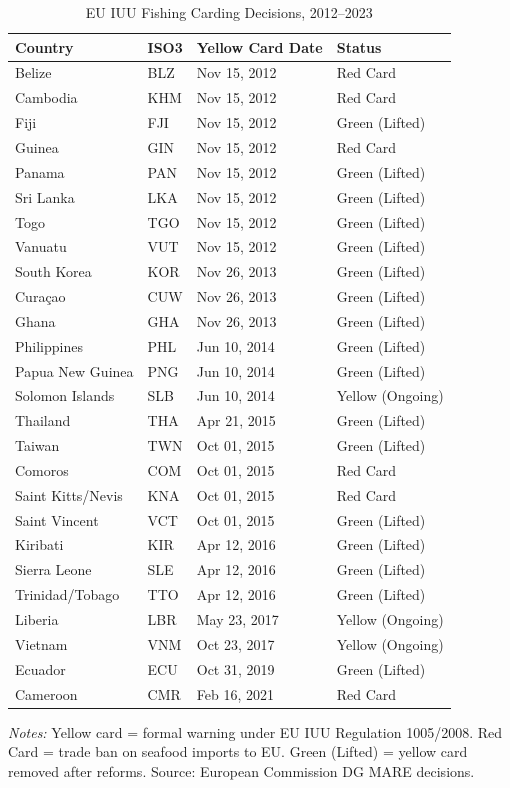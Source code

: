 \begin{table}[t]
\centering
\caption{EU IUU Fishing Carding Decisions, 2012--2023}
\label{tab:cohorts}
\begin{threeparttable}
\begin{tabular}{llll}
\toprule
Country & ISO3 & Yellow Card Date & Status \\
\midrule
Belize & BLZ & Nov 15, 2012 & Red Card \\
Cambodia & KHM & Nov 15, 2012 & Red Card \\
Fiji & FJI & Nov 15, 2012 & Green (Lifted) \\
Guinea & GIN & Nov 15, 2012 & Red Card \\
Panama & PAN & Nov 15, 2012 & Green (Lifted) \\
Sri Lanka & LKA & Nov 15, 2012 & Green (Lifted) \\
Togo & TGO & Nov 15, 2012 & Green (Lifted) \\
Vanuatu & VUT & Nov 15, 2012 & Green (Lifted) \\
South Korea & KOR & Nov 26, 2013 & Green (Lifted) \\
Curaçao & CUW & Nov 26, 2013 & Green (Lifted) \\
Ghana & GHA & Nov 26, 2013 & Green (Lifted) \\
Philippines & PHL & Jun 10, 2014 & Green (Lifted) \\
Papua New Guinea & PNG & Jun 10, 2014 & Green (Lifted) \\
Solomon Islands & SLB & Jun 10, 2014 & Yellow (Ongoing) \\
Thailand & THA & Apr 21, 2015 & Green (Lifted) \\
Taiwan & TWN & Oct 01, 2015 & Green (Lifted) \\
Comoros & COM & Oct 01, 2015 & Red Card \\
Saint Kitts/Nevis & KNA & Oct 01, 2015 & Red Card \\
Saint Vincent & VCT & Oct 01, 2015 & Green (Lifted) \\
Kiribati & KIR & Apr 12, 2016 & Green (Lifted) \\
Sierra Leone & SLE & Apr 12, 2016 & Green (Lifted) \\
Trinidad/Tobago & TTO & Apr 12, 2016 & Green (Lifted) \\
Liberia & LBR & May 23, 2017 & Yellow (Ongoing) \\
Vietnam & VNM & Oct 23, 2017 & Yellow (Ongoing) \\
Ecuador & ECU & Oct 31, 2019 & Green (Lifted) \\
Cameroon & CMR & Feb 16, 2021 & Red Card \\
\bottomrule
\end{tabular}
\begin{tablenotes}[flushleft]
\small
\item \textit{Notes:} Yellow card = formal warning under EU IUU Regulation 1005/2008. Red Card = trade ban on seafood imports to EU. Green (Lifted) = yellow card removed after reforms. Source: European Commission DG MARE decisions.
\end{tablenotes}
\end{threeparttable}
\end{table}
